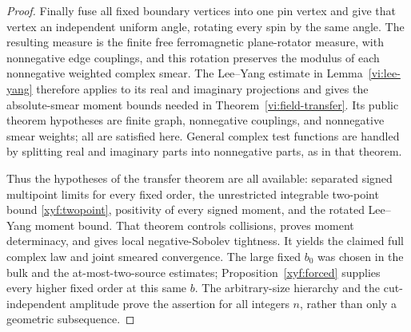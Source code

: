 \begin{proof}
Finally fuse all fixed boundary vertices into one pin vertex and
give that vertex an independent uniform angle, rotating every
spin by the same angle.  The resulting measure is the finite
free ferromagnetic plane-rotator measure, with nonnegative edge
couplings, and this rotation preserves the modulus of each
nonnegative weighted complex smear.  The Lee--Yang estimate in
Lemma~\ref{vi:lee-yang} therefore applies to its real and imaginary
projections and gives the absolute-smear moment bounds needed in
Theorem~\ref{vi:field-transfer}.  Its public theorem hypotheses are
finite graph, nonnegative couplings, and nonnegative smear weights;
all are satisfied here.  General complex test functions are handled
by splitting real and imaginary parts into nonnegative parts, as
in that theorem.

Thus the hypotheses of the transfer theorem are all available:
separated signed multipoint limits for every fixed order, the
unrestricted integrable two-point bound \eqref{xyf:twopoint},
positivity of every signed moment, and the rotated Lee--Yang
moment bound.  That theorem controls collisions, proves moment
determinacy, and gives local negative-Sobolev tightness.  It yields
the claimed full complex law and joint smeared convergence.
The large fixed \(b_0\) was chosen in the bulk and the at-most-two-source
estimates; Proposition~\ref{xyf:forced} supplies every higher fixed
order at this same \(b\).  The arbitrary-size hierarchy and the
cut-independent amplitude prove the assertion for all integers
\(n\), rather than only a geometric subsequence.
\end{proof}
